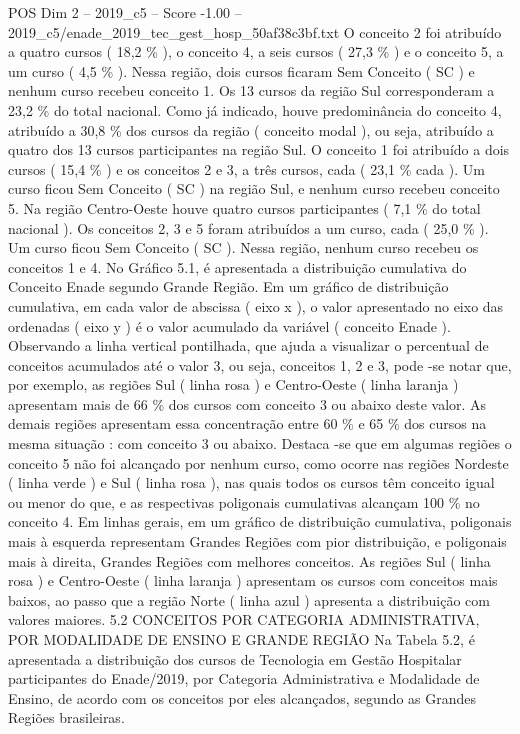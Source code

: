 \begin{textsample}{POS Dim 2 – 2019\_c5 – Score -1.00 – 2019\_c5/enade\_2019\_tec\_gest\_hosp\_50af38c3bf.txt}
O conceito 2 foi atribuído a quatro cursos ( 18,2 \% ), o conceito 4, a seis cursos ( 27,3 \% ) e o conceito 5, a um curso ( 4,5 \% ).
Nessa região, dois cursos ficaram Sem Conceito ( SC ) e nenhum curso recebeu conceito 1.
Os 13 cursos da região Sul corresponderam a 23,2 \% do total nacional.
Como já indicado, houve predominância do conceito 4, atribuído a 30,8 \% dos cursos da região ( conceito modal ), ou seja, atribuído a quatro dos 13 cursos participantes na região Sul.
O conceito 1 foi atribuído a dois cursos ( 15,4 \% ) e os conceitos 2 e 3, a três cursos, cada ( 23,1 \% cada ).
Um curso ficou Sem Conceito ( SC ) na região Sul, e nenhum curso recebeu conceito 5.
Na região Centro-Oeste houve quatro cursos participantes ( 7,1 \% do total nacional ).
Os conceitos 2, 3 e 5 foram atribuídos a um curso, cada ( 25,0 \% ).
Um curso ficou Sem Conceito ( SC ).
Nessa região, nenhum curso recebeu os conceitos 1 e 4.
No Gráfico 5.1, é apresentada a distribuição cumulativa do Conceito Enade segundo Grande Região.
Em um gráfico de distribuição cumulativa, em cada valor de abscissa ( eixo x ), o valor apresentado no eixo das ordenadas ( eixo y ) é o valor acumulado da variável ( conceito Enade ).
Observando a linha vertical pontilhada, que ajuda a visualizar o percentual de conceitos acumulados até o valor 3, ou seja, conceitos 1, 2 e 3, pode -se notar que, por exemplo, as regiões Sul ( linha rosa ) e Centro-Oeste ( linha laranja ) apresentam mais de 66 \% dos cursos com conceito 3 ou abaixo deste valor.
As demais regiões apresentam essa concentração entre 60 \% e 65 \% dos cursos na mesma situação : com conceito 3 ou abaixo.
Destaca -se que em algumas regiões o conceito 5 não foi alcançado por nenhum curso, como ocorre nas regiões Nordeste ( linha verde ) e Sul ( linha rosa ), nas quais todos os cursos têm conceito igual ou menor do que, e as respectivas poligonais cumulativas alcançam 100 \% no conceito 4.
Em linhas gerais, em um gráfico de distribuição cumulativa, poligonais mais à esquerda representam Grandes Regiões com pior distribuição, e poligonais mais à direita, Grandes Regiões com melhores conceitos.
As regiões Sul ( linha rosa ) e Centro-Oeste ( linha laranja ) apresentam os cursos com conceitos mais baixos, ao passo que a região Norte ( linha azul ) apresenta a distribuição com valores maiores. 5.2 CONCEITOS POR CATEGORIA ADMINISTRATIVA, POR MODALIDADE DE ENSINO E GRANDE REGIÃO Na Tabela 5.2, é apresentada a distribuição dos cursos de Tecnologia em Gestão Hospitalar participantes do Enade/2019, por Categoria Administrativa e Modalidade de Ensino, de acordo com os conceitos por eles alcançados, segundo as Grandes Regiões brasileiras.

\end{textsample}
